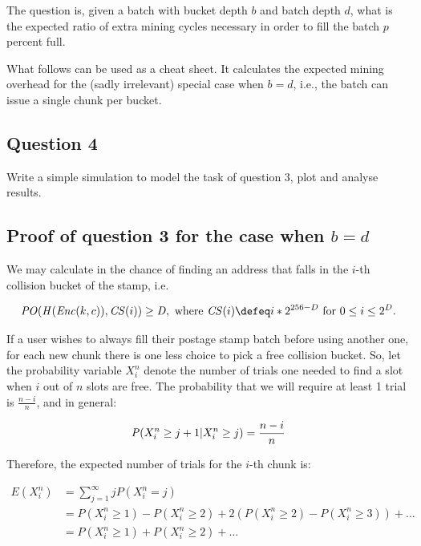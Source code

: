 The question is, given a batch with bucket depth $b$ and batch depth $d$, what is the expected ratio of extra mining cycles necessary in order to fill the batch $p$ percent full.

What follows can be used as a cheat sheet. It calculates the expected mining overhead for the (sadly irrelevant) special case when $b=d$, i.e., the batch can issue a single chunk per bucket.


\subsection*{Question 4}
Write a simple simulation to model the task of question 3, plot and analyse results.

\newpage
\subsection*{Proof of question 3 for the case when $b=d$}

We may calculate in the chance of finding an address that falls in the $i$-th collision bucket of the stamp, i.e.


\begin{equation}
\mathit{PO}(\mathit{H}(\mathit{Enc}(k, c)), \mathit{CS}(i))\geq\mathit{D},
\text{ where }\mathit{CS}(i)\defeq i*2^{256-D}
\text{ for }0\leq i\leq  2^D.
\end{equation}

If a user wishes to always fill their postage stamp batch before using another one, for each new chunk there is one less choice to pick a free collision bucket. So, let the probability variable $X^n_i$ denote  the number of trials one needed to find a slot when $i$ out of $n$ slots are free. The probability that we will require at least 1 trial is $\frac{n-i}{n}$, and in general:


\begin{equation}\label{eq:conditional}
\mathit{P}(X^n_i\geq j+1|X^n_i\geq j)=\frac{n-i}{n}\\
\end{equation}

Therefore, the expected number of trials for the $i$-th chunk is: 

 \begin{subequations}   \begin{align}
\mathit{E}(X^n_i)&=\sum^\infty_{j=1}j\mathit{P}(X^n_i=j)\\
&=\mathit{P}(X^n_i\geq 1)-\mathit{P}(X^n_i\geq 2)+2(\mathit{P}(X^n_i\geq 2)-P(X^n_i\geq 3))+\ldots\\
&= \mathit{P}(X^n_i\geq 1)+\mathit{P}(X^n_i\geq 2)+\ldots
\end{align} \end{subequations}

